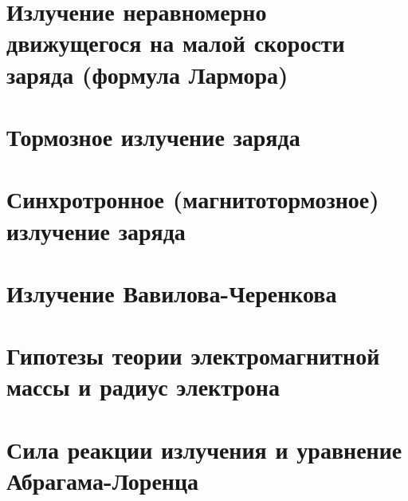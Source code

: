 \begin{multicols*}{2}
		\section{Излучение неравномерно движущегося на малой скорости заряда (формула Лармора)}
		
		\section{Тормозное излучение заряда}
		
		\section{Синхротронное (магнитотормозное) излучение заряда}
		
		\section{Излучение Вавилова-Черенкова}
		
		\section{Гипотезы теории электромагнитной массы и радиус электрона}
		
		\section{Сила реакции излучения и уравнение Абрагама-Лоренца}
		
	\end{multicols*}

